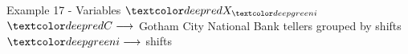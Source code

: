 \begin{frame}{Example 17 - Variables}
\Huge{
$\colora{X}_{\colorb{i}}$\\    
}
\small{
$\colora{C} \longrightarrow$
    Gotham City National Bank tellers grouped by shifts\\
$\colorb{i} \longrightarrow$
    shifts
}
\end{frame}
